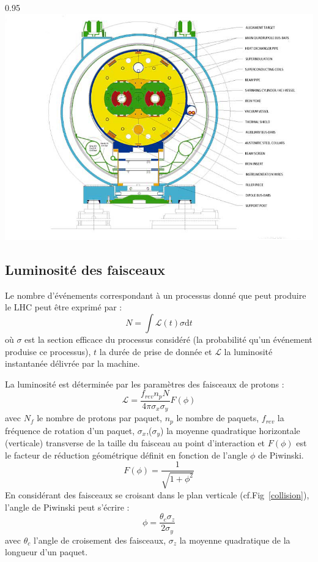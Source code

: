 \begin{minipagewithmarginpars}[ht!]{0.95\textwidth}
\centering
\includegraphics[width=1.0\textwidth]{LHC/dipole.jpg}
\label{dipole}	
\end{minipagewithmarginpars}

\subsection{Luminosité des faisceaux}
Le nombre d'événements correspondant à un processus donné que peut produire le LHC peut être exprimé par :
\begin{equation}
N=\int \mathcal{L}(t)\sigma \mathrm dt
\end{equation}
où $\sigma$ est la section efficace du processus considéré (la probabilité qu'un événement produise ce processus), $t$ la durée de prise de donnée et $\mathcal{L}$ la luminosité instantanée délivrée par la machine.

La luminosité est déterminée par les paramètres des faisceaux de protons :
\begin{equation}
\mathcal{L}=\frac{f_{rev}n_{p}N_{}}{4\pi \sigma_{x} \sigma_{y}} F(\phi)
\end{equation}
avec $N_{f}$ le nombre de protons par paquet, $n_{p}$ le nombre de paquets, $f_{rev}$ la fréquence de rotation d'un paquet, $\sigma_{x}$,($\sigma_{y}$) la moyenne quadratique horizontale (verticale) transverse de la taille du faisceau au point d'interaction et $F(\phi)$ est le facteur de réduction géométrique définit en fonction de l'angle $\phi$ de Piwinski.
\begin{equation}
F(\phi)=\frac{1}{\sqrt{1+\phi^{2}}}
\end{equation}
En considérant des faisceaux se croisant dans le plan verticale (cf.Fig~\ref{collision}), l'angle de Piwinski peut s'écrire :
\begin{equation}
\phi=\frac{\theta_{c}\sigma_{z}}{2\sigma_{y}}
\end{equation}
avec $\theta_{c}$ l'angle de croisement des faisceaux, $\sigma_{z}$ la moyenne quadratique de la longueur d'un paquet.



